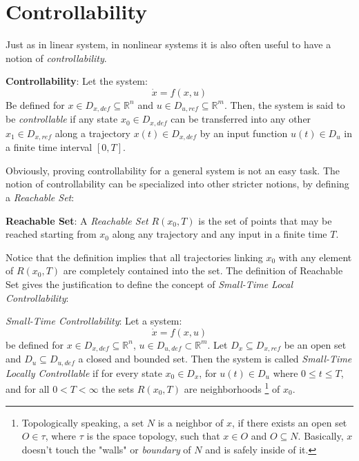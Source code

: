             \section{Controllability}
            Just as in linear system, in nonlinear systems it is also often useful to have a notion of \textit{controllability}.             
            \begin{definition}\label{controllability}
                \textbf{Controllability}: Let the system:
                \[\dot{x}=f(x,u)\]
                Be defined for $x \in D_{x,def}\subseteq \mathbb{R}^{n}$ and $u \in D_{u,ref} \subseteq \mathbb{R}^{m}$. Then, the system is said to be \textit{controllable} if any state $x_0 \in D_{x,def}$ can be transferred into any other $x_1 \in D_{x,ref}$ along a trajectory $x(t)\in D_{x,def}$ by an input function $u(t) \in D_{u}$ in a finite time interval $[0,T]$.
            \end{definition}
            Obviously, proving controllability for a general system is not an easy task. The notion of controllability can be specialized into other stricter notions, by defining a \textit{Reachable Set}:
            \begin{definition}
                \textbf{Reachable Set}: A \textit{Reachable Set} $R(x_0,T)$ is the set of points that may be reached starting from $x_0$ along any trajectory and any input in a finite time $T$.
            \end{definition}
            Notice that the definition implies that all trajectories linking $x_0$ with any element of $R(x_0,T)$ are completely contained into the set. The definition of Reachable Set gives the justification to define the concept of \textit{Small-Time Local Controllability}:
            \begin{definition}
                \textit{Small-Time Controllability}: Let a system:
                \[\dot{x}=f(x,u)\]
                be defined for $x \in D_{x,def} \subseteq \mathbb{R}^{n}$, $u \in D_{u,def} \subset \mathbb{R}^{m}$. Let $D_x \subseteq D_{x,ref}$ be an open set and $D_u \subseteq D_{u,def}$ a closed and bounded set. Then the system is called \textit{Small-Time Locally Controllable} if for every state $x_0\in D_x$, for $u(t) \in D_u$ where $0\leq t \leq T$, and for all $0 < T < \infty$ the sets $R(x_0,T)$ are neighborhoods \footnote{Topologically speaking, a set $N$ is a neighbor of $x$, if there exists an open set $O\in\tau$, where $\tau$ is the space topology, such that $x\in O$ and $O\subseteq N$. Basically, $x$ doesn't touch the "walls" or \textit{boundary} of $N$ and is safely inside of it.} of $x_0$.
            \end{definition}
